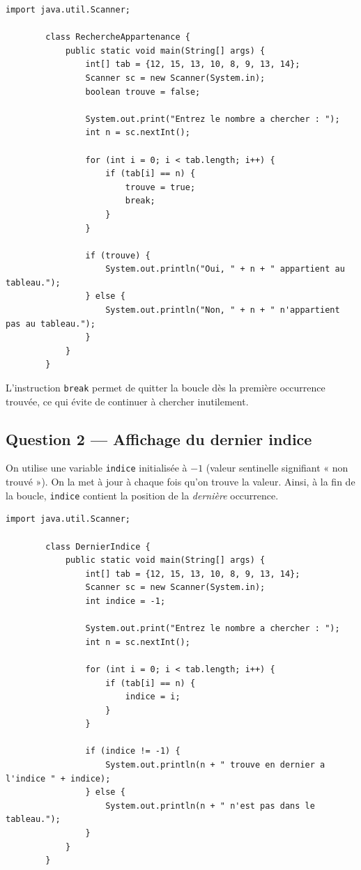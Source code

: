 \documentclass[12pt,a4paper]{article}
\begin{document}
	\begin{lstlisting}[style=java, caption={Q1 — Appartenance au tableau}]
		import java.util.Scanner;
		
		class RechercheAppartenance {
			public static void main(String[] args) {
				int[] tab = {12, 15, 13, 10, 8, 9, 13, 14};
				Scanner sc = new Scanner(System.in);
				boolean trouve = false;
				
				System.out.print("Entrez le nombre a chercher : ");
				int n = sc.nextInt();
				
				for (int i = 0; i < tab.length; i++) {
					if (tab[i] == n) {
						trouve = true;
						break;
					}
				}
				
				if (trouve) {
					System.out.println("Oui, " + n + " appartient au tableau.");
				} else {
					System.out.println("Non, " + n + " n'appartient pas au tableau.");
				}
			}
		}
	\end{lstlisting}
	
	\begin{boiteResultat}
		L'instruction \texttt{break} permet de quitter la boucle dès la première occurrence
		trouvée, ce qui évite de continuer à chercher inutilement.
	\end{boiteResultat}
	
	\subsection*{Question 2 — Affichage du dernier indice}
	
	\begin{boiteRaisonnement}
		On utilise une variable \texttt{indice} initialisée à $-1$ (valeur sentinelle signifiant
		« non trouvé »). On la met à jour à chaque fois qu'on trouve la valeur. Ainsi, à la fin
		de la boucle, \texttt{indice} contient la position de la \emph{dernière} occurrence.
	\end{boiteRaisonnement}
	
	\begin{lstlisting}[style=java, caption={Q2 — Dernier indice de la valeur}]
		import java.util.Scanner;
		
		class DernierIndice {
			public static void main(String[] args) {
				int[] tab = {12, 15, 13, 10, 8, 9, 13, 14};
				Scanner sc = new Scanner(System.in);
				int indice = -1;
				
				System.out.print("Entrez le nombre a chercher : ");
				int n = sc.nextInt();
				
				for (int i = 0; i < tab.length; i++) {
					if (tab[i] == n) {
						indice = i;
					}
				}
				
				if (indice != -1) {
					System.out.println(n + " trouve en dernier a l'indice " + indice);
				} else {
					System.out.println(n + " n'est pas dans le tableau.");
				}
			}
		}
	\end{lstlisting}
	
\end{document}
